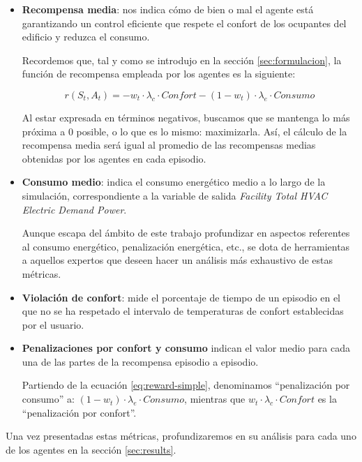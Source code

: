 \begin{itemize}
    \item \textbf{Recompensa media}: nos indica cómo de bien o mal el agente está garantizando un control eficiente que respete el confort de los ocupantes del edificio y reduzca el consumo.
    
    Recordemos que, tal y como se introdujo en la sección \ref{sec:formulacion}, la función de recompensa empleada por los agentes es la siguiente:
    
    \begin{equation}
        \label{eq:reward-simple}
        r(S_t, A_t) = - w_t \cdot \lambda_c \cdot Confort - (1-w_t) \cdot \lambda_e \cdot Consumo
    \end{equation}
    
     Al estar expresada en términos negativos, buscamos que se mantenga lo más próxima a $0$ posible, o lo que es lo mismo: maximizarla. Así, el cálculo de la recompensa media será igual al promedio de las recompensas medias obtenidas por los agentes en cada episodio.
    
    \item \textbf{Consumo medio}: indica el consumo energético medio a lo largo de la simulación, correspondiente a la variable de salida \textit{Facility Total HVAC Electric Demand Power}. 
    
    Aunque escapa del ámbito de este trabajo profundizar en aspectos referentes al consumo energético, penalización energética, etc., se dota de herramientas a aquellos expertos que deseen hacer un análisis más exhaustivo de estas métricas.
    
    \item \textbf{Violación de confort}: mide el porcentaje de tiempo de un episodio en el que no se ha respetado el intervalo de temperaturas de confort establecidas por el usuario.
    
    \item \textbf{Penalizaciones por confort y consumo} indican el valor medio para cada una de las partes de la recompensa episodio a episodio.
    
    Partiendo de la ecuación \ref{eq:reward-simple}, denominamos ``penalización por consumo'' a: $(1-w_t) \cdot \lambda_e \cdot Consumo$, mientras que $w_t \cdot \lambda_c \cdot Confort$ es la ``penalización por confort''.
\end{itemize}

Una vez presentadas estas métricas, profundizaremos en su análisis para cada uno de los agentes en la sección \ref{sec:results}.

